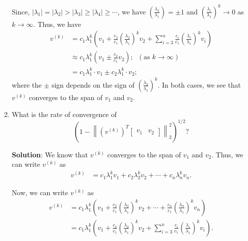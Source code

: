 \documentclass[11pt,onecolumn]{article}
\begin{document}
\begin{enumerate}[label=(\alph*)]
	      Since, $\lvert\lambda_1\rvert = \lvert\lambda_2\rvert > \lvert \lambda_3\rvert \geq \lvert\lambda_4\rvert \geq \cdots$, we have $\left(\frac{\lambda_2}{\lambda_1}\right) = \pm 1$ and $\left(\frac{\lambda_i}{\lambda_1}\right)^k \to 0$ as $k\to\infty$.
	      Thus, we have
	      \begin{align*}
		      v^{(k)} & = c_1\lambda_1^k\left(v_1 + \frac{c_2}{c_1}\left(\frac{\lambda_2}{\lambda_1}\right)^kv_2 + \sum_{i=3}^{n}\frac{c_i}{c_1}\left(\frac{\lambda_i}{\lambda_1}\right)^kv_i\right) \\
		              & \approx c_1\lambda_1^k\left(v_1 \pm \frac{c_2}{c_1}v_2\right);\;\;          (\text{as $k\to \infty$})                                                                        \\
		              & = c_1\lambda_1^k\cdot v_1 \pm c_2\lambda_1^k\cdot v_2;
	      \end{align*}
	      where the $\pm$ sign depends on the sign of $\left(\frac{\lambda_2}{\lambda_1}\right)^k$. In both cases, we see that $v^{(k)}$ converges to the span of $v_1$ and $v_2$.
	\item What is the rate of convergence of $$\left(1-\left\|\left(v^{(k)}\right)^T\begin{bmatrix}v_1 & v_2\end{bmatrix}\right\|^2_2\right)^{1/2}?$$

	      \textbf{Solution}:
	      We know that $v^{(k)}$ converges to the span of $v_1$ and $v_2$. Thus, we can write $v^{(k)}$ as
	      \begin{align*}
		      v^{(k)} & = c_1\lambda_1^k v_1 + c_2\lambda_2^k v_2 + \cdots + c_n\lambda_n^k v_n.
	      \end{align*}

	      Now, we can write $v^{(k)}$ as
	      \begin{align*}
		      v^{(k)} & = c_1\lambda_1^k\left(v_1 + \frac{c_2}{c_1}\left(\frac{\lambda_2}{\lambda_1}\right)^k v_2 + \cdots + \frac{c_n}{c_1}\left(\frac{\lambda_n}{\lambda_1}\right)^k v_n\right)       \\
		              & = c_1\lambda_1^k\left(v_1 + \frac{c_2}{c_1}\left(\frac{\lambda_2}{\lambda_1}\right)^k v_2 + \sum_{i=3}^{n}\frac{c_i}{c_1}\left(\frac{\lambda_i}{\lambda_1}\right)^k v_i\right).
	      \end{align*}


\end{enumerate}
\end{document}
